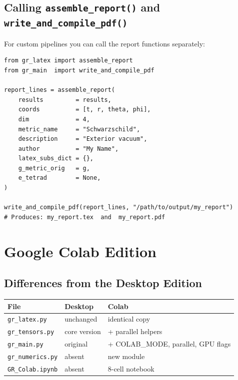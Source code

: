 \documentclass[11pt,a4paper]{article}
\newcommand{\code}[1]{\texttt{\small#1}}
\begin{document}
\subsection{Calling \code{assemble\_report()} and \code{write\_and\_compile\_pdf()}}

For custom pipelines you can call the report functions separately:

\begin{lstlisting}
from gr_latex import assemble_report
from gr_main  import write_and_compile_pdf

report_lines = assemble_report(
    results         = results,
    coords          = [t, r, theta, phi],
    dim             = 4,
    metric_name     = "Schwarzschild",
    description     = "Exterior vacuum",
    author          = "My Name",
    latex_subs_dict = {},
    g_metric_orig   = g,
    e_tetrad        = None,
)

write_and_compile_pdf(report_lines, "/path/to/output/my_report")
# Produces: my_report.tex  and  my_report.pdf
\end{lstlisting}

\section{Google Colab Edition}
\label{sec:colab}

\subsection{Differences from the Desktop Edition}

\begin{center}
\begin{tabular}{lll}
  \toprule
  File & Desktop & Colab \\
  \midrule
  \code{gr\_latex.py} & unchanged & identical copy \\
  \code{gr\_tensors.py} & core version & + parallel helpers \\
  \code{gr\_main.py} & original & + COLAB\_MODE, parallel, GPU flags \\
  \code{gr\_numerics.py} & absent & new module \\
  \code{GR\_Colab.ipynb} & absent & 8-cell notebook \\
  \bottomrule
\end{tabular}
\end{center}
\end{document}
